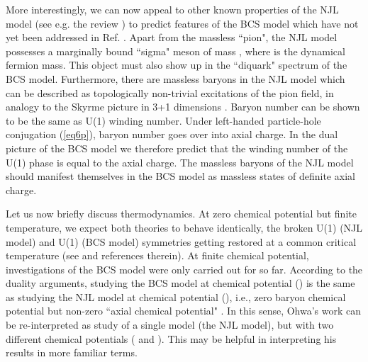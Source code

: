 \documentclass[a4paper,twocolumn,aps]{revtex4}
\begin{document}
More interestingly, we
can now appeal to other known properties of the NJL\coordHE{} model (see e.g. the review \cite{R9}) to predict
features of the BCS\coordHE{} model which have not yet been addressed in Ref. \cite{R1}.
Apart from the massless ``pion", the NJL\coordHE{} model possesses a marginally bound
``sigma" meson of mass \coordHE{}, where \coordHE{} is the dynamical fermion mass. This object must also
show up in the ``diquark" spectrum of the BCS\coordHE{} model. Furthermore, there are massless baryons
in the NJL\coordHE{} model which can be described as topologically non-trivial excitations of the pion field,
in analogy to the Skyrme picture in 3+1 dimensions \cite{R9}. Baryon number can be shown to be 
the same as U(1)\coordHE{} winding number.
Under left-handed particle-hole conjugation (\ref{eq6p}), baryon number
goes over into axial charge.
In the dual picture of the BCS\coordHE{} model we therefore predict that the winding number of the U(1)\coordHE{} phase
is equal to the axial charge. The massless baryons of the NJL\coordHE{} model should manifest
themselves in the BCS\coordHE{} model as massless states of definite axial charge.

Let us now briefly discuss thermodynamics.
At zero chemical potential but finite temperature, we expect both theories to behave identically,
the broken U(1)\coordHE{} (NJL\coordHE{} model) and U(1)\coordHE{} (BCS\coordHE{} model) symmetries
getting restored at a common critical temperature \coordHE{} (see \cite{R9} and references
therein). At finite chemical potential, investigations of the BCS\coordHE{} model were only carried
out for \coordHE{} so far. According to the duality arguments, studying the BCS\coordHE{} model at chemical potential
(\coordHE{}) is the same as studying the NJL\coordHE{} model at chemical potential (\coordHE{}), i.e., zero baryon
chemical potential but non-zero ``axial chemical potential" \coordHE{}. In this sense, Ohwa's work \cite{R7}
can be re-interpreted as study of a single model (the NJL\coordHE{} model), but with two different chemical potentials
(\myHighlight{$\mu$}\coordHE{} and \coordHE{}). This may be helpful in interpreting his results in more familiar terms.
\end{document}
